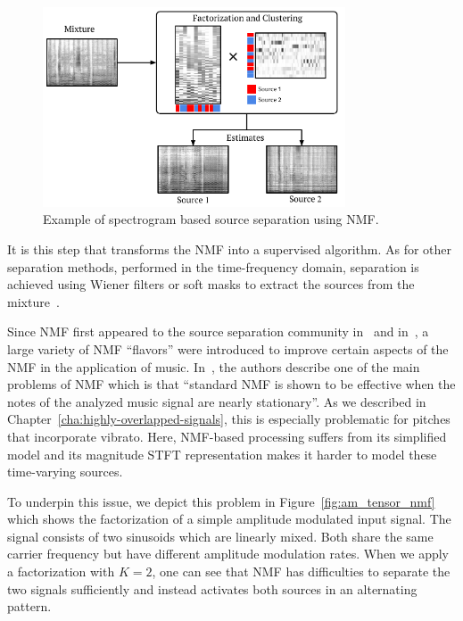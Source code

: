 \begin{figure}[h]
  \centering
  \includegraphics[width=0.8\textwidth]{Chapters/06_Separation_Unknown/figures/nmf_separation.pdf}
  \caption{Example of spectrogram based source separation using \ac{NMF}.}
  \label{fig:nmf_separation}
\end{figure}

It is this step that transforms the \acs{NMF} into a supervised algorithm.
As for other separation methods, performed in the time-frequency domain, separation is achieved using Wiener filters or soft masks to extract the sources from the mixture~\cite{liutkus15c}.
\par
Since \acs{NMF} first appeared to the source separation community in~\cite{smaragdis03} and in~\cite{vembu05}, a large variety of NMF ``flavors'' were introduced to improve certain aspects of the \acs{NMF} in the application of music. 
In~\cite[Chapter 16]{vincent}, the authors describe one of the main problems of \acs{NMF} which is that ``standard \acs{NMF} is shown to be effective when the notes of the analyzed music signal are nearly stationary''.
As we described in Chapter~\ref{cha:highly-overlapped-signals}, this is especially problematic for pitches that incorporate vibrato.
Here, \acs{NMF}-based processing suffers from its simplified model and its magnitude \acs{STFT} representation makes it harder to model these time-varying sources.
\par
To underpin this issue, we depict this problem in Figure~\ref{fig:am_tensor_nmf} which shows the factorization of a simple amplitude modulated input signal. 
The signal consists of two sinusoids which are linearly mixed. 
Both share the same carrier frequency but have different amplitude modulation rates. 
When we apply a factorization with $K=2$, one can see that \acs{NMF} has difficulties to separate the two signals sufficiently and instead activates both sources in an alternating pattern.

